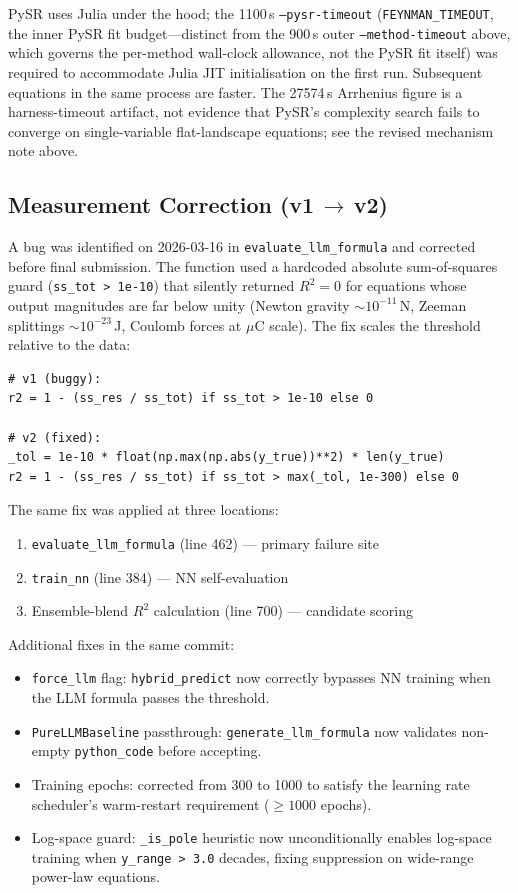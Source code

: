 \documentclass[twoside,11pt]{article}
\begin{document}
\noindent PySR uses Julia under the hood; the 1100\,s
\texttt{--pysr-timeout} (\texttt{FEYNMAN\_TIMEOUT}, the inner PySR fit
budget---distinct from the 900\,s outer \texttt{--method-timeout} above,
which governs the per-method wall-clock allowance, not the PySR fit itself)
was required to accommodate Julia JIT initialisation on the first run.
Subsequent equations in the same process are faster. The 27574\,s Arrhenius
figure is a harness-timeout artifact, not evidence that PySR's complexity
search fails to converge on single-variable flat-landscape equations; see
the revised mechanism note above.

\subsection*{Measurement Correction (v1\,$\to$\,v2)}
\label{sec:r2_measurement_bugfix}

A bug was identified on 2026-03-16 in \texttt{evaluate\_llm\_formula}
and corrected before final submission. The function used a hardcoded
absolute sum-of-squares guard (\texttt{ss\_tot > 1e-10}) that silently
returned $R^2=0$ for equations whose output magnitudes are far below unity
(Newton gravity $\sim\!10^{-11}$\,N, Zeeman splittings $\sim\!10^{-23}$\,J,
Coulomb forces at $\mu$C scale). The fix scales the threshold relative
to the data:

\begin{verbatim}
# v1 (buggy):
r2 = 1 - (ss_res / ss_tot) if ss_tot > 1e-10 else 0

# v2 (fixed):
_tol = 1e-10 * float(np.max(np.abs(y_true))**2) * len(y_true)
r2 = 1 - (ss_res / ss_tot) if ss_tot > max(_tol, 1e-300) else 0
\end{verbatim}

The same fix was applied at three locations:
\begin{enumerate}
  \item \texttt{evaluate\_llm\_formula} (line 462) — primary failure site
  \item \texttt{train\_nn} (line 384) — NN self-evaluation
  \item Ensemble-blend $R^2$ calculation (line 700) — candidate scoring
\end{enumerate}

Additional fixes in the same commit:
\begin{itemize}
  \item \texttt{force\_llm} flag: \texttt{hybrid\_predict} now correctly
    bypasses NN training when the LLM formula passes the threshold.
  \item \texttt{PureLLMBaseline} passthrough: \texttt{generate\_llm\_formula}
    now validates non-empty \texttt{python\_code} before accepting.
  \item Training epochs: corrected from 300 to 1000 to satisfy the learning
    rate scheduler's warm-restart requirement ($\geq\!1000$ epochs).
  \item Log-space guard: \texttt{\_is\_pole} heuristic now unconditionally
    enables log-space training when \texttt{y\_range > 3.0} decades,
    fixing suppression on wide-range power-law equations.
\end{itemize}
\end{document}
